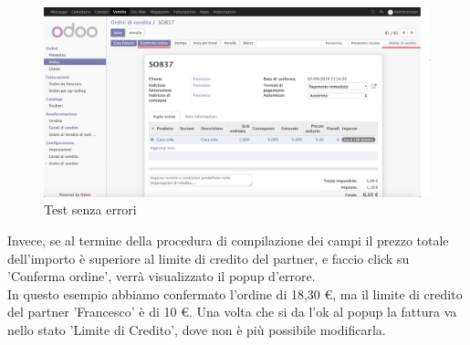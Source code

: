 \begin{figure}[H]
	\begin{center} \includegraphics[scale=0.3]{figures/first_test}
		\caption[Test senza errori]{Test senza errori}
		\label{fig:first_test}
	\end{center}
\end{figure}

Invece, se al termine della procedura di compilazione dei campi il prezzo totale dell'importo è superiore al limite di credito del partner, e faccio click su 'Conferma ordine', verrà visualizzato il popup d'errore.\\
In questo esempio abbiamo confermato l'ordine di 18,30 €, ma il limite di credito del partner 'Francesco' è di 10 €.
Una volta che si da l'ok al popup la fattura va nello stato 'Limite di Credito', dove non è più possibile modificarla.


